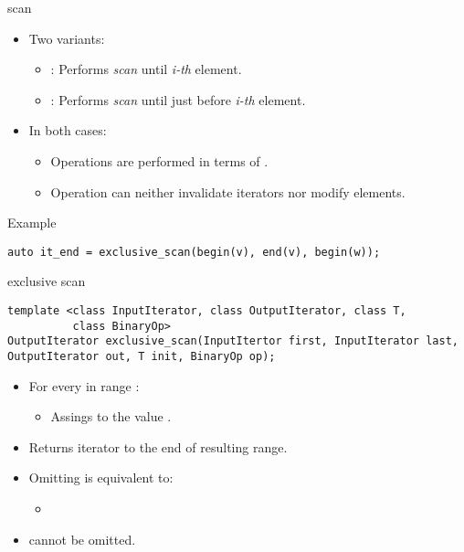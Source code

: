 \begin{frame}[t,fragile]{scan}
\begin{itemize}
  \item Two variants:
    \begin{itemize}
      \item {}: Performs \emph{scan} until \emph{i-th} element.
      \item {}: Performs \emph{scan} until just before \emph{i-th} element.
    \end{itemize}
  \item In both cases:
    \begin{itemize}
      \item Operations are performed in terms of .
      \item Operation can neither invalidate iterators nor modify elements.
    \end{itemize}
\end{itemize}
\begin{block}{Example}
\begin{lstlisting}[]
auto it_end = exclusive_scan(begin(v), end(v), begin(w));
\end{lstlisting}
\end{block}
\end{frame}

\begin{frame}[t,fragile]{exclusive scan}
\begin{lstlisting}[]
template <class InputIterator, class OutputIterator, class T, 
          class BinaryOp>
OutputIterator exclusive_scan(InputItertor first, InputIterator last, OutputIterator out, T init, BinaryOp op);
\end{lstlisting}
\begin{itemize}
  \item For every  in range \cppid{[out, out + (last-first))}:
    \begin{itemize}
      \item Assings to  the value
        .
    \end{itemize}
  \item Returns iterator to the end of resulting range.
  \vfill
  \item Omitting  is equivalent to:
    \begin{itemize}
      \item {}
    \end{itemize}
  \item {} cannot be omitted.
\end{itemize}
\end{frame}

